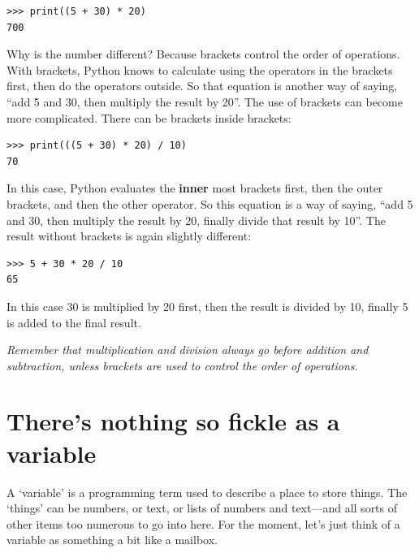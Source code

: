 \begin{listing}
\begin{verbatim}
>>> print((5 + 30) * 20)
700
\end{verbatim}
\end{listing}

\noindent
Why is the number different?  Because brackets control the order of operations.  With brackets, Python knows to calculate using the operators in the brackets first, then do the operators outside.  So that equation is another way of saying, ``add 5 and 30, then multiply the result by 20''.
The use of brackets can become more complicated.  There can be brackets inside brackets:

\begin{listing}
\begin{verbatim}
>>> print(((5 + 30) * 20) / 10)
70
\end{verbatim}
\end{listing}

\noindent
In this case, Python evaluates the \textbf{inner} most brackets first, then the outer brackets, and then the other operator.  So this equation is a way of saying, ``add 5 and 30, then multiply the result by 20, finally divide that result by 10''.  The result without brackets is again slightly different:

\begin{listing}
\begin{verbatim}
>>> 5 + 30 * 20 / 10
65
\end{verbatim}
\end{listing}

In this case 30 is multiplied by 20 first, then the result is divided by 10, finally 5 is added to the final result.

\emph{Remember that multiplication and division always go before addition and subtraction, unless brackets are used to control the order of operations.}

\section{There's nothing so fickle as a variable}

A `variable' is a programming term used to describe a place to store things.  The `things' can be numbers, or text, or lists of numbers and text---and all sorts of other items too numerous to go into here.  For the moment, let's just think of a variable as something a bit like a mailbox.


